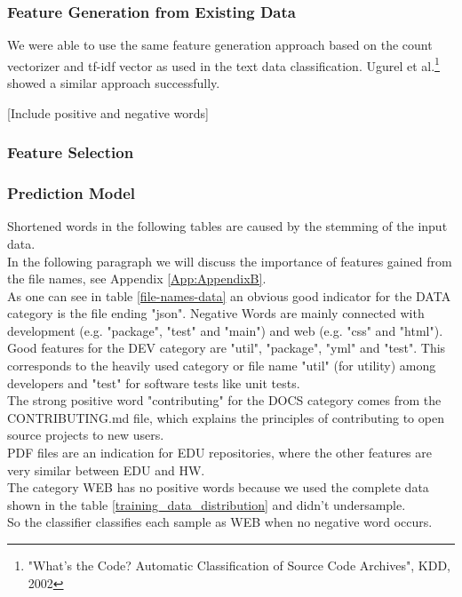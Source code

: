 \documentclass[%
a4paper,
DIV12,
2.5headlines,
bigheadings,
titlepage,
openbib,
]{scrartcl}
\begin{document}
\subsubsection{Feature Generation from Existing
Data}\label{feature-generation-from-existing-data-1}

We were able to use the same feature generation approach based on the count vectorizer and tf-idf vector as used in the text data classification.
Ugurel et al.\footnote{"What's the Code? Automatic Classification of Source Code Archives", KDD, 2002} showed a similar approach successfully.

[Include positive and negative words]

\subsubsection{Feature Selection}\label{feature-selection-2}


\subsubsection{Prediction Model}\label{prediction-model-2}

Shortened words in the following tables are caused by the stemming of the input data.\\

In the following paragraph we will discuss the importance of features gained from the file names, see Appendix \ref{App:AppendixB}. \\
As one can see in table \ref{file-names-data} an obvious good indicator for the DATA category is the file ending "json". 
Negative Words are mainly connected with development (e.g. "package", "test" and "main") and web (e.g. "css" and "html").\\
Good features for the DEV category are "util", "package", "yml" and "test". 
This corresponds to the heavily used category or file name "util" (for utility) among developers and "test" for software tests like unit tests. \\
The strong positive word "contributing" for the DOCS category comes from the CONTRIBUTING.md file, which explains the principles of contributing to open source projects to new users.\\
PDF files are an indication for EDU repositories, where the other features are very similar between EDU and HW.\\
The category WEB has no positive words because we used the complete data shown in the table \ref{training_data_distribution} and didn't undersample.\\
So the classifier classifies each sample as WEB when no negative word occurs.\\
\end{document}

